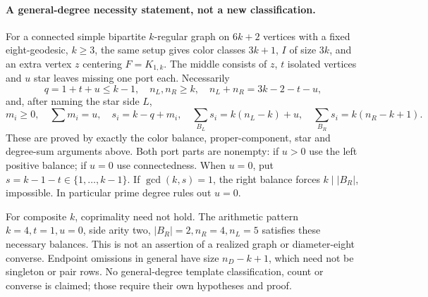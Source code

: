 \documentclass[11pt]{article}
\begin{document}
\paragraph{A general-degree necessity statement, not a new classification.}
For a connected simple bipartite $k$-regular graph on $6k+2$ vertices
with a fixed eight-geodesic, $k\geq3$, the same setup gives color
classes $3k+1$, $I$ of size $3k$, and an extra vertex $z$ centering
$F=K_{1,k}$. The middle consists of $z$, $t$ isolated vertices and
$u$ star leaves missing one port each. Necessarily
\[
 q=1+t+u\leq k-1,\quad n_L,n_R\geq k,\quad
 n_L+n_R=3k-2-t-u,
\]
and, after naming the star side $L$,
\[
 m_i\geq0,\quad\sum m_i=u,\quad s_i=k-q+m_i,
\quad \sum_{B_L}s_i=k(n_L-k)+u,
\quad \sum_{B_R}s_i=k(n_R-k+1).                    \tag{6}
\]
These are proved by exactly the color balance, proper-component,
star and degree-sum arguments above. Both port parts are nonempty:
if $u>0$ use the left positive balance; if $u=0$ use connectedness.
When $u=0$, put $s=k-1-t\in\{1,\ldots,k-1\}$. If
$\gcd(k,s)=1$, the right balance forces $k\mid|B_R|$, impossible.
In particular prime degree rules out $u=0$.

For composite $k$, coprimality need not hold. The arithmetic pattern
$k=4,t=1,u=0$, side arity two, $|B_R|=2,n_R=4,n_L=5$
satisfies these necessary balances. This is not an assertion of a
realized graph or diameter-eight converse. Endpoint omissions in
general have size $n_D-k+1$, which need not be singleton or pair
rows. No general-degree template classification, count or converse
is claimed; those require their own hypotheses and proof.
\end{document}
